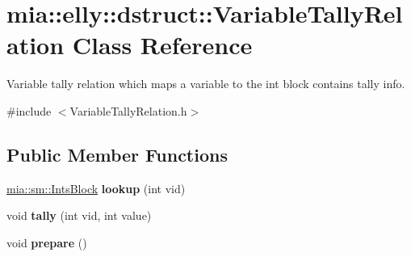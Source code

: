 \hypertarget{classmia_1_1elly_1_1dstruct_1_1_variable_tally_relation}{\section{mia\-:\-:elly\-:\-:dstruct\-:\-:Variable\-Tally\-Relation Class Reference}
\label{classmia_1_1elly_1_1dstruct_1_1_variable_tally_relation}
}


Variable tally relation which maps a variable to the int block contains tally info.  




{\ttfamily \#include $<$Variable\-Tally\-Relation.\-h$>$}

\subsection*{Public Member Functions}
\begin{DoxyCompactItemize}
\item 
\hypertarget{classmia_1_1elly_1_1dstruct_1_1_variable_tally_relation_a9d181c38b6f5b0a00f9ae033ea9ca14b}{\hyperlink{classmia_1_1sm_1_1_ints_block}{mia\-::sm\-::\-Ints\-Block} {\bfseries lookup} (int vid)}\label{classmia_1_1elly_1_1dstruct_1_1_variable_tally_relation_a9d181c38b6f5b0a00f9ae033ea9ca14b}

\item 
\hypertarget{classmia_1_1elly_1_1dstruct_1_1_variable_tally_relation_a43fe583de7fae37ec40ba1f86a5a0a0c}{void {\bfseries tally} (int vid, int value)}\label{classmia_1_1elly_1_1dstruct_1_1_variable_tally_relation_a43fe583de7fae37ec40ba1f86a5a0a0c}

\item 
\hypertarget{classmia_1_1elly_1_1dstruct_1_1_variable_tally_relation_a9619f574476f63f659c93e4585a9df1f}{void {\bfseries prepare} ()}\label{classmia_1_1elly_1_1dstruct_1_1_variable_tally_relation_a9619f574476f63f659c93e4585a9df1f}

\end{DoxyCompactItemize}
